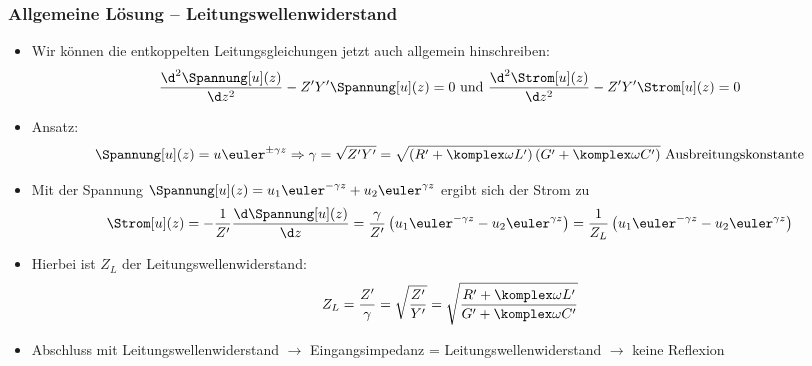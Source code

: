   \begin{frame}
    \frametitle{Allgemeine Lösung -- Leitungswellenwiderstand}
      \begin{itemize}[<+->]
      \item Wir können die entkoppelten Leitungsgleichungen jetzt auch allgemein hinschreiben:
    \begin{equation*}
      \frac{\d^2 \Spannung[u](z)}{\d z^2} -  Z^\prime Y^\prime \Spannung[u](z) = 0 \text{ und } \frac{\d^2 \Strom[u](z)}{\d z^2} -  Z^\prime Y^\prime \Strom[u](z) = 0
    \end{equation*}
  \item Ansatz:
    \begin{equation*}
      \Spannung[u](z) = u \euler^{\pm\gamma z} \Rightarrow \gamma = \sqrt{Z^\prime Y^\prime} = \sqrt{\left(R^\prime + \komplex\omega L^\prime\right) \left(G^\prime + \komplex\omega C^\prime\right)} \text{ Ausbreitungskonstante}
    \end{equation*}
  \item Mit der Spannung \(\Spannung[u](z) = u_1 \euler^{-\gamma z} + u_2 \euler^{\gamma z}\) ergibt sich der Strom zu
    \begin{equation*}
      \Strom[u](z) = - \frac{1}{Z^\prime} \frac{\d \Spannung[u](z)}{\d z} = \frac{\gamma}{Z^\prime} \left( u_1 \euler^{-\gamma z} - u_2 \euler^{\gamma z}\right) = \frac{1}{Z_L} \left( u_1 \euler^{-\gamma z} - u_2 \euler^{\gamma z}\right)  
    \end{equation*}
  \item Hierbei ist \(Z_L\) der \alert{Leitungswellenwiderstand}:
    \begin{equation*}
      Z_L= \frac{Z^\prime}{\gamma} = \sqrt{\frac{Z^\prime}{Y^\prime}} = \sqrt{\frac{R^\prime + \komplex\omega L^\prime}{G^\prime + \komplex\omega C^\prime}} 
    \end{equation*}
    \item Abschluss mit Leitungswellenwiderstand \(\to\) Eingangsimpedanz = Leitungswellenwiderstand \(\to\) \alert{keine Reflexion}
    \end{itemize}
    \ 
  \end{frame}
  
